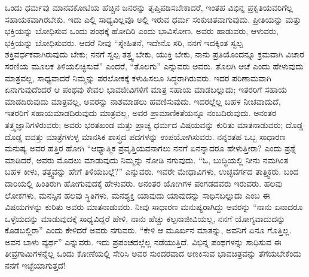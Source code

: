 ಒಂದು ಧರ್ಮವು ಮಾನವಕೋಟಿಯ ಹೆಚ್ಚಿನ ಜನರನ್ನು ತೃಪ್ತಿಪಡಿಸಬೇಕಾದರೆ, ಇಂತಹ ವಿಭಿನ್ನ ಪ್ರಕೃತಿಯವರಿಗೆಲ್ಲ ಸಹಾಯಕವಾಗಿರಬೇಕು. ಇದು ಎಲ್ಲಿ ಸಾಧ್ಯವಿಲ್ಲವೊ ಅಲ್ಲಿ ಇರುವ ಧರ್ಮ ಸಂಕುಚಿತವಾಗುವುದು. ಪ್ರೀತಿಯನ್ನು ಮತ್ತು ಭಕ್ತಿಯನ್ನು ಬೋಧಿಸುವ ಒಂದು ಪಂಥಕ್ಕೆ ಹೋದಿರಿ ಎಂದು ಭಾವಿಸೋಣ. ಅವರು ಹಾಡುವರು, ಆಳುವರು, ಭಕ್ತಿಯನ್ನು ಬೋಧಿಸುವರು. ಆದರೆ ನೀವು “ಸ್ನೇಹಿತನೆ, ಇದೇನೊ ಸರಿ, ನನಗೆ ಇದಕ್ಕಿಂತ ಸ್ವಲ್ಪ ಶಕ್ತಿವರ್ಧಕವಾಗಿರುವುದು ಬೇಕು; ನನಗೆ ಸ್ವಲ್ಪ ತತ್ತ್ವ ಬೇಕು, ಯುಕ್ತಿ ಬೇಕು, ನಾನು ಪ್ರತಿಯೊಂದನ್ನೂ ಕ್ರಮವಾಗಿ ವಿಚಾರ ಸರಣಿಯ ಮೂಲಕ ತಿಳಿಯಲಿಚ್ಛಿಸುವೆ” ಎಂದರೆ, “ತೊಲಗು” ಎನ್ನುವರು ಅವರು. ತೊಲಗಿ ಆಚೆ ಎಂದು ಹೇಳುವುದು ಮಾತ್ರವಲ್ಲ, ಸಾಧ್ಯವಾದರೆ ನಿಮ್ಮನ್ನು ಪರಲೋಕಕ್ಕೆ ಕಳುಹಿಸಲೂ ಸಿದ್ಧರಾಗಿರುವರು. ಇದರ ಪರಿಣಾಮವಾಗಿ ಏನಾಗುವುದೆಂದರೆ ಆ ಪಂಥವು ಕೇವಲ ಭಾವಜೀವಿಗಳಿಗೆ ಮಾತ್ರ ಸಹಾಯ ಮಾಡಬಲ್ಲುದು; ಇತರರಿಗೆ ಸಹಾಯ ಮಾಡದಿರುವುದು ಮಾತ್ರವಲ್ಲ, ಅವರನ್ನು ನಾಶಮಾಡಲು ಹವಣಿಸುವುದು. ಇದರಲ್ಲೆಲ್ಲ ಬಹಳ ನೀಚವಾದುದೆ, ಇತರರಿಗೆ ಸಹಾಯಮಾಡದಿರುವುದು ಮಾತ್ರವಲ್ಲ, ಅವರ ಪ್ರಾಮಾಣಿಕತೆಯನ್ನೂ ನಂಬದಿರುವುದು. ಅನಂತರ ತತ್ತ್ವಜ್ಞಾನಿಗಳಿರುವರು; ಅವರು ಭರತಖಂಡ ಮತ್ತು ಪ್ರಾಚ್ಯ ಧರ್ಮದ ವಿಷಯವನ್ನು ಕುರಿತು ಮಾತನಾಡುವರು; ದೊಡ್ಡ ದೊಡ್ಡ ಐವತ್ತು ಮಾತ್ರೆಗಳುಳ್ಳ ಮಾನಸಿಕ ಶಾಸ್ತ್ರದ ಪದಗಳನ್ನು ಉಪಯೋಗಿಸುವರು. ನನ್ನಂತಹ ಒಬ್ಬ ಸಾಧಾರಣ ಮನುಷ್ಯ ಅವರ ಹತ್ತಿರ ಹೋಗಿ “ಆಧ್ಯಾತ್ಮಿಕ ಪ್ರವೃತ್ತಿಯವನಾಗಲು ನನಗೆ ಏನನ್ನಾದರೂ ಹೇಳುತ್ತೀರಾ? ಎಂದು ಪ್ರಶ್ನೆ ಮಾಡಿದರೆ, ಅವರು ಮೊದಲು ಮಾಡುವುದು ನಿಮ್ಮನ್ನು ನೋಡಿ ನಗುವುದು. “ಓ, ಬುದ್ಧಿಯಲ್ಲಿ ನೀನು ನಮಗಿಂತ ಬಹಳ ಕೀಳು, ತತ್ತ್ವವನ್ನು ಹೇಗೆ ತಿಳಿಯಬಲ್ಲೆ?” ಎನ್ನುವರು. ಇವರೇ ಮೇಧಾವಿಗಳು, ಉಚ್ಛವರ್ಗದ ತಾತ್ತ್ವಿಕರು. ಬಂದ ದಾರಿಯಲ್ಲಿ ಹಿಂತಿರುಗಿ ಹೋಗುವುದಕ್ಕೆ ಹೇಳುವರು. ಅನಂತರ ಯೋಗಿಗಳ ಪಂಗಡದವರು ಇರುವರು. ಹಲವು ಲೋಕಗಳು, ಮನಸ್ಸಿನ ಹಲವು ಸ್ಥಿತಿಗಳು, ಮನಶ್ಯಕ್ತಿ ಯಾವುದು ಯಾವುದನ್ನು ಸಾಧಿಸಬಲ್ಲುದು ಎಂಬ ಈ ವಿಷಯಗಳನ್ನು ಕುರಿತು ಅವರು ಮಾತನಾಡುವರು. ನೀವು ಸಾಧಾರಣ ಮನುಷ್ಯರಾಗಿದ್ದು ಅವರನ್ನು “ನಾನು ಏನಾದರೂ ಒಳ್ಳೆಯದನ್ನು ಮಾಡುವುದಕ್ಕೆ ಸಾಧ್ಯವಿದ್ದರೆ ಹೇಳಿ, ನಾನು ಹೆಚ್ಚು ಕಲ್ಪನಾಜೀವಿಯಲ್ಲ, ನನಗೆ ಯೋಗ್ಯವಾದುದನ್ನು ಕೊಡಬಲ್ಲಿರಾ” ಎಂದು ಕೇಳಿದರೆ ಅವರು ನಗುವರು. “ಕೇಳಿ ಆ ಮೂರ್ಖನ ಮಾತನ್ನು, ಅವನಿಗೆ ಏನೂ ಗೊತ್ತಿಲ್ಲ. ಅವನ ಬಾಳು ವ್ಯರ್ಥ” ಎನ್ನುವರು. ಇದು ಪ್ರಪಂಚದಲ್ಲೆಲ್ಲ ನಡೆಯುತ್ತಿದೆ. ವಿಭಿನ್ನ ಪಂಥಗಳನ್ನು ಸಾಧಿಸುವ ಈ ತೀವ್ರಗಾಮಿಗಳನ್ನೆಲ್ಲ ಒಂದು ಕೋಣೆಯಲ್ಲಿ ಸೇರಿಸಿ ಅವರ ಸುಂದರವಾದ ಅಣಕಿಸುವ ಭಾವಚಿತ್ರವನ್ನು ತೆಗೆಯಬೇಕೆಂದು ನನಗೆ ಇಚ್ಛೆಯಾಗುತ್ತದೆ!

